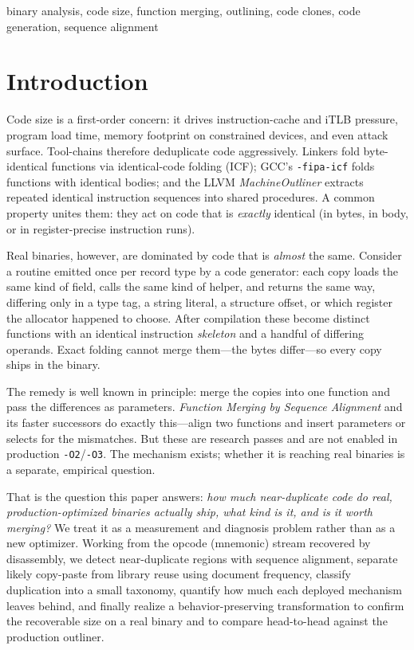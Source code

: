 \documentclass[conference]{IEEEtran}
\begin{document}
\begin{IEEEkeywords}
binary analysis, code size, function merging, outlining, code clones,
code generation, sequence alignment
\end{IEEEkeywords}

\section{Introduction}
Code size is a first-order concern: it drives instruction-cache and iTLB
pressure, program load time, memory footprint on constrained devices, and
even attack surface. Tool-chains therefore deduplicate code aggressively.
Linkers fold byte-identical functions via identical-code folding (ICF); GCC's
\texttt{-fipa-icf} folds functions with identical bodies; and the LLVM
\emph{MachineOutliner} \cite{paquette2016outliner} extracts repeated identical
instruction sequences into shared procedures. A common property unites them:
they act on code that is \emph{exactly} identical (in bytes, in body, or in
register-precise instruction runs).

Real binaries, however, are dominated by code that is \emph{almost} the same.
Consider a routine emitted once per record type by a code generator: each copy
loads the same kind of field, calls the same kind of helper, and returns the
same way, differing only in a type tag, a string literal, a structure offset,
or which register the allocator happened to choose. After compilation these
become distinct functions with an identical instruction \emph{skeleton} and a
handful of differing operands. Exact folding cannot merge them---the bytes
differ---so every copy ships in the binary.

The remedy is well known in principle: merge the copies into one function and
pass the differences as parameters. \emph{Function Merging by Sequence
Alignment} \cite{rocha2019fmsa} and its faster successors
\cite{rocha2020hyfm,rocha2021f3m} do exactly this---align two functions and
insert parameters or selects for the mismatches. But these are research passes
and are not enabled in production \texttt{-O2}/\texttt{-O3}. The mechanism
exists; whether it is reaching real binaries is a separate, empirical
question.

That is the question this paper answers: \emph{how much near-duplicate code do
real, production-optimized binaries actually ship, what kind is it, and is it
worth merging?} We treat it as a measurement and diagnosis problem rather than
as a new optimizer. Working from the opcode (mnemonic) stream recovered by
disassembly, we detect near-duplicate regions with sequence alignment,
separate likely copy-paste from library reuse using document frequency,
classify duplication into a small taxonomy, quantify how much each deployed
mechanism leaves behind, and finally realize a behavior-preserving
transformation to confirm the recoverable size on a real binary and to compare
head-to-head against the production outliner.
\end{document}
